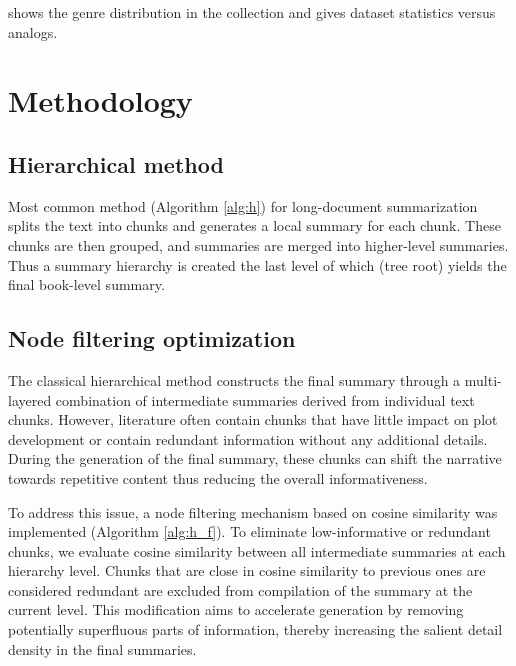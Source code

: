 \documentclass{superfri}
\begin{document}
 shows the genre distribution in the collection and  gives dataset statistics versus analogs.

\section{Methodology}
\subsection{Hierarchical method}
Most common method (Algorithm \ref{alg:h}) for long-document summarization \cite{hierarchical} splits the text into chunks and
generates a local summary for each chunk.
These chunks are then grouped, and summaries are merged into higher-level summaries.
Thus a summary hierarchy is created the last level of which (tree root) yields the final book-level summary.

\subsection{Node filtering optimization}
The classical hierarchical method constructs the final summary through a multi-layered combination of intermediate summaries derived from individual text chunks.
However, literature often contain chunks that have little impact on plot development or contain redundant information without any additional details. 
During the generation of the final summary, these chunks can shift the narrative towards repetitive content thus reducing the overall informativeness.

To address this issue, a node filtering mechanism based on cosine similarity was implemented (Algorithm \ref{alg:h_f}).
To eliminate low-informative or redundant chunks, we evaluate cosine similarity between all intermediate summaries at each hierarchy level.
Chunks that are close in cosine similarity to previous ones are considered redundant are excluded from compilation of the summary at the current level.
This modification aims to accelerate generation by removing potentially superfluous parts of information, 
thereby increasing the salient detail density in the final summaries.
\end{document}
